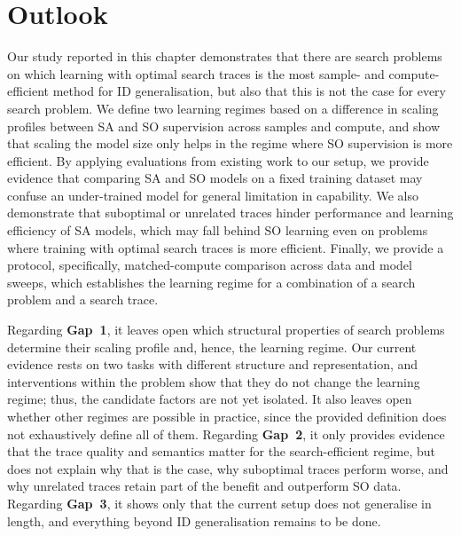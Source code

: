 \section{Outlook}
\label{sec:progress_outlook}

Our study reported in this chapter demonstrates that there are search problems on which learning with optimal search traces is the most sample- and compute-efficient method for ID generalisation, but also that this is not the case for every search problem.
We define two learning regimes based on a difference in scaling profiles between SA and SO supervision across samples and compute, and show that scaling the model size only helps in the regime where SO supervision is more efficient.
By applying evaluations from existing work to our setup, we provide evidence that comparing SA and SO models on a fixed training dataset may confuse an under-trained model for general limitation in capability.
We also demonstrate that suboptimal or unrelated traces hinder performance and learning efficiency of SA models, which may fall behind SO learning even on problems where training with optimal search traces is more efficient.
Finally, we provide a protocol, specifically, matched-compute comparison across data and model sweeps, which establishes the learning regime for a combination of a search problem and a search trace.

Regarding \textbf{Gap~1}, it leaves open which structural properties of search problems determine their scaling profile and, hence, the learning regime.
Our current evidence rests on two tasks with different structure and representation, and interventions within the problem show that they do not change the learning regime; thus, the candidate factors are not yet isolated.
It also leaves open whether other regimes are possible in practice, since the provided definition does not exhaustively define all of them.
Regarding \textbf{Gap~2}, it only provides evidence that the trace quality and semantics matter for the search-efficient regime, but does not explain why that is the case, why suboptimal traces perform worse, and why unrelated traces retain part of the benefit and outperform SO data.
Regarding \textbf{Gap~3}, it shows only that the current setup does not generalise in length, and everything beyond ID generalisation remains to be done.

%
